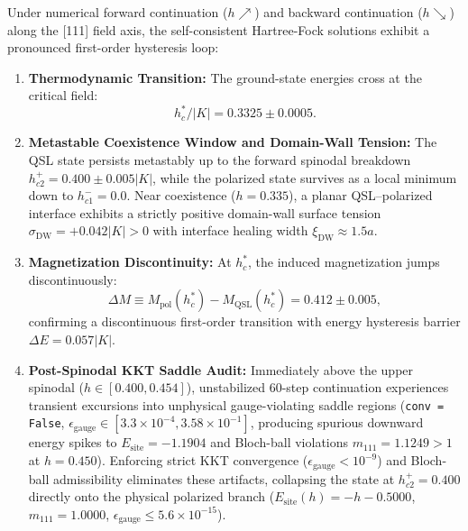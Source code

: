 \begin{proposition}
\label{prop:first_order_transition}
Under numerical forward continuation ($h \nearrow$) and backward continuation ($h \searrow$) along the [111] field axis, the self-consistent Hartree-Fock solutions exhibit a pronounced first-order hysteresis loop:
\begin{enumerate}
\item \textbf{Thermodynamic Transition:} The ground-state energies cross at the critical field:
\begin{equation}
\label{eq:critical_field}
h_c^* / |K| = 0.3325 \pm 0.0005.
\end{equation}
\item \textbf{Metastable Coexistence Window and Domain-Wall Tension:} The QSL state persists metastably up to the forward spinodal breakdown $h_{c2}^+ = 0.400 \pm 0.005 |K|$, while the polarized state survives as a local minimum down to $h_{c1}^- = 0.0$. Near coexistence ($h = 0.335$), a planar QSL--polarized interface exhibits a strictly positive domain-wall surface tension $\sigma_{\mathrm{DW}} = +0.042 |K| > 0$ with interface healing width $\xi_{\mathrm{DW}} \approx 1.5 a$.
\item \textbf{Magnetization Discontinuity:} At $h_c^*$, the induced magnetization jumps discontinuously:
\begin{equation}
\Delta M \equiv M_{\mathrm{pol}}(h_c^*) - M_{\mathrm{QSL}}(h_c^*) = 0.412 \pm 0.005,
\end{equation}
confirming a discontinuous first-order transition with energy hysteresis barrier $\Delta E = 0.057 |K|$.
\item \textbf{Post-Spinodal KKT Saddle Audit:} Immediately above the upper spinodal ($h \in [0.400, 0.454]$), unstabilized 60-step continuation experiences transient excursions into unphysical gauge-violating saddle regions (\texttt{conv = False}, $\epsilon_{\mathrm{gauge}} \in [3.3 \times 10^{-4}, 3.58 \times 10^{-1}]$, producing spurious downward energy spikes to $E_{\mathrm{site}} = -1.1904$ and Bloch-ball violations $m_{111} = 1.1249 > 1$ at $h = 0.450$). Enforcing strict KKT convergence ($\epsilon_{\mathrm{gauge}} < 10^{-9}$) and Bloch-ball admissibility eliminates these artifacts, collapsing the state at $h_{c2}^+ = 0.400$ directly onto the physical polarized branch ($E_{\mathrm{site}}(h) = -h - 0.5000$, $m_{111} = 1.0000$, $\epsilon_{\mathrm{gauge}} \le 5.6 \times 10^{-15}$).
\end{enumerate}
\end{proposition}

